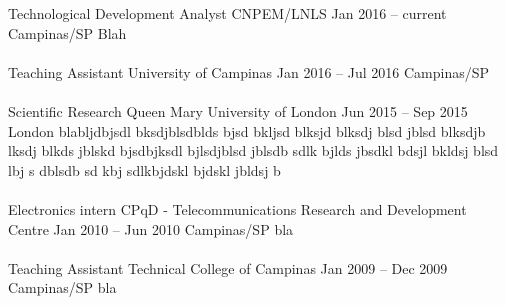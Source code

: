 \documentclass[
	a4paper,
]{fortysecondscv}
\newcommand{\profiledivider}{\textcolor{body!30}{\hdashrule{\linewidth}{0.6pt}{0.5ex}}\\}
\begin{document}
\makefrontsidebar

\graphicspath{{../figures/work/}}
    \cvevent
        {Technological Development Analyst}
        {CNPEM/LNLS}
        {Jan 2016 -- current}
        {Campinas/SP}
        {}
        {Blah}
    \\\profiledivider
    \cvevent
        {Teaching Assistant}
        {University of Campinas}
        {Jan 2016 -- Jul 2016}
        {Campinas/SP}
        {}
        {\blindtext}
    \\\profiledivider
    \cvevent
        {Scientific Research}
        {Queen Mary University of London}
        {Jun 2015 -- Sep 2015}
        {London}
        {}
        {blabljdbjsdl bksdjblsdblds bjsd bkljsd blksjd blksdj blsd jblsd blksdjb lksdj blkds jblskd bjsdbjksdl bjlsdjblsd jblsdb sdlk bjlds jbsdkl bdsjl bkldsj blsd lbj s dblsdb sd kbj sdlkbjdskl bjdskl jbldsj b}
    \\\profiledivider
    \cvevent
        {Electronics intern}
        {CPqD - Telecommunications Research and Development Centre}
        {Jan 2010 -- Jun 2010}
        {Campinas/SP}
        {}
        {bla}
    \\\profiledivider
    \cvevent
        {Teaching Assistant}
        {Technical College of Campinas}
        {Jan 2009 -- Dec 2009}
        {Campinas/SP}
        {}
        {bla}
    \\\profiledivider
\end{document}
